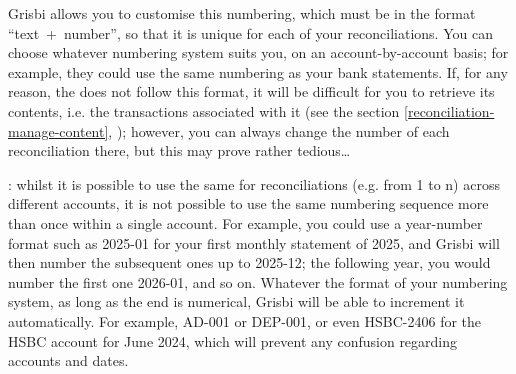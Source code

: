 Grisbi allows you to customise this numbering, which must be in the format \enquote{text~+~number}, so that it is unique for each of your reconciliations. You can choose whatever numbering system suits you, on an account-by-account basis; for example, they could use the same numbering as your bank statements. If, for any reason, the  does not follow this format, it will be difficult for you to retrieve its contents, i.e. the transactions associated with it (see the section \vref{reconciliation-manage-content}, ); however, you can always change the number of each reconciliation there, but this may prove rather tedious\ldots

\Note{}: whilst it is possible to use the same  for reconciliations (e.g. from 1 to n) across different accounts, it is not possible to use the same numbering sequence more than once within a single account. For example, you could use a year-number format such as 2025-01 for your first monthly statement of 2025, and Grisbi will then number the subsequent ones up to 2025-12; the following year, you would number the first one 2026-01, and so on. Whatever the format of your numbering system, as long as the end is numerical, Grisbi will be able to increment it automatically. For example, AD-001 or DEP-001, or even HSBC-2406 for the HSBC account for June 2024, which will prevent any confusion regarding accounts and dates.  


